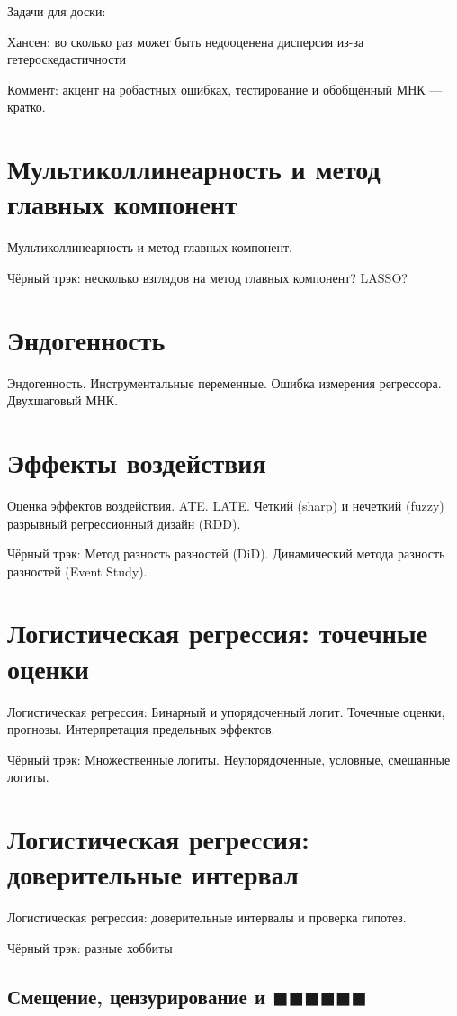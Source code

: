 \documentclass[12pt]{article}
\begin{document}
Задачи для доски:

Хансен: во сколько раз может быть недооценена дисперсия из-за гетероскедастичности


Коммент: акцент на робастных ошибках, тестирование и обобщённый МНК — кратко.

\section{Мультиколлинеарность и метод главных компонент}
Мультиколлинеарность и метод главных компонент.

Чёрный трэк: несколько взглядов на метод главных компонент? LASSO?


\section{Эндогенность}
Эндогенность. Инструментальные переменные. Ошибка измерения регрессора. Двухшаговый МНК.


\section{Эффекты воздействия}
Оценка эффектов воздействия. ATE. LATE. Четкий (sharp) и нечеткий (fuzzy) разрывный регрессионный дизайн (RDD).

Чёрный трэк: Метод разность разностей (DiD). Динамический метода разность разностей (Event Study).



\section{Логистическая регрессия: точечные оценки}
Логистическая регрессия: Бинарный и упорядоченный логит. Точечные оценки, прогнозы.  Интерпретация предельных эффектов.

Чёрный трэк: Множественные логиты. Неупорядоченные, условные, смешанные логиты.

\section{Логистическая регрессия: доверительные интервал}
Логистическая регрессия: доверительные интервалы и проверка гипотез.

Чёрный трэк: разные хоббиты

\subsection{Смещение, цензурирование и $\blacksquare\blacksquare\blacksquare\blacksquare\blacksquare\blacksquare$}
\end{document}
